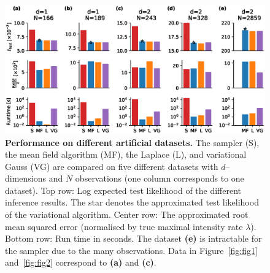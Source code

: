 \documentclass[twoside,11pt]{article}
\begin{document}
\begin{figure}
\centering
\includegraphics[width=.9\textwidth]{figures/fig4.eps}
\caption{{\bf Performance on different artificial datasets.} The sampler (S), the mean field algorithm (MF), the Laplace (L), and variational Gauss (VG) are compared on five different datasets with $d$--dimensions and $N$ observations (one column corresponds to one dataset). Top row: Log expected test likelihood of the different inference results. The star denotes the approximated test likelihood of the variational algorithm. Center row: The approximated root mean squared error (normalised by true maximal intensity rate $\lambda$). Bottom row: Run time in seconds. The dataset {\bf (e)} is intractable for the sampler due to the many observations. Data in Figure~\ref{fig:fig1} and~\ref{fig:fig2} correspond to {\bf (a)} and {\bf (c)}.}\label{fig:fig4}
\end{figure}
\end{document}
